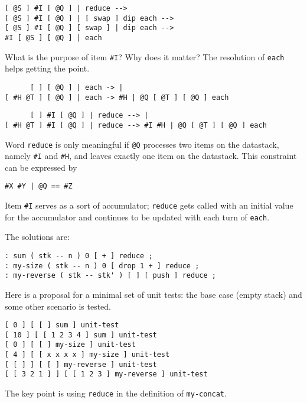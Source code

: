 \begin{verbatim}
[ @S ] #I [ @Q ] | reduce -->
[ @S ] #I [ @Q ] | [ swap ] dip each -->
[ @S ] #I [ @Q ] [ swap ] | dip each -->
#I [ @S ] [ @Q ] | each
\end{verbatim}

What is the purpose of item \verb|#I|? Why does it matter? The resolution of \verb|each| helps getting the point.

\begin{verbatim}
      [ ] [ @Q ] | each -> |
[ #H @T ] [ @Q ] | each -> #H | @Q [ @T ] [ @Q ] each
\end{verbatim}

\begin{verbatim}
      [ ] #I [ @Q ] | reduce --> |
[ #H @T ] #I [ @Q ] | reduce --> #I #H | @Q [ @T ] [ @Q ] each
\end{verbatim}

Word \verb|reduce| is only meaningful if \verb|@Q| processes two items on the datastack, namely \verb|#I| and \verb|#H|, and leaves exactly one item on the datastack. This constraint can be expressed by

\begin{verbatim}
#X #Y | @Q == #Z
\end{verbatim}

Item \verb|#I| serves as a sort of accumulator; \verb|reduce| gets called with an initial value for the accumulator and continues to be updated with each turn of \verb|each|.

The solutions are:

\begin{verbatim}
: sum ( stk -- n ) 0 [ + ] reduce ;
: my-size ( stk -- n ) 0 [ drop 1 + ] reduce ;
: my-reverse ( stk -- stk' ) [ ] [ push ] reduce ;
\end{verbatim}

Here is a proposal for a minimal set of unit tests: the base case (empty stack) and some other scenario is tested.

\begin{verbatim}
[ 0 ] [ [ ] sum ] unit-test
[ 10 ] [ [ 1 2 3 4 ] sum ] unit-test
[ 0 ] [ [ ] my-size ] unit-test
[ 4 ] [ [ x x x x ] my-size ] unit-test
[ [ ] ] [ [ ] my-reverse ] unit-test
[ [ 3 2 1 ] ] [ [ 1 2 3 ] my-reverse ] unit-test
\end{verbatim}

The key point is using \verb|reduce| in the definition of \verb|my-concat|.

